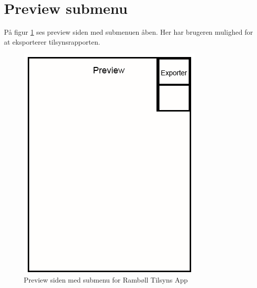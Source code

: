 \section{Preview submenu}\label{sec:PreviewSubMock}
På figur \ref{fig:PreviewSubMock} ses preview siden med submenuen åben. Her har brugeren mulighed for at eksporterer tilsynsrapporten.

\begin{figure}[H]
	\centering
	\includegraphics[width=0.4\linewidth]{MockUps/Mock/Ramboell-Preview-Sub}
	\caption{Preview siden med submenu for Rambøll Tilsyns App}
	\label{fig:PreviewSubMock}
\end{figure}
